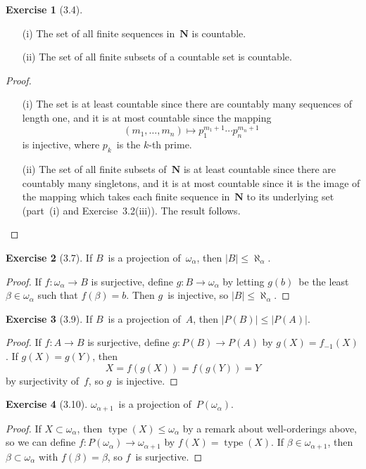 \documentclass[letterpaper,12pt]{article}
\newcommand{\N}{\boldsymbol{N}}
\renewcommand{\P}{P}
\DeclareMathOperator{\type}{type}
\newcommand{\preimage}[1]{#1_{-1}}
\newcommand{\card}[1]{|#1|}
\theoremstyle{definition}
\newtheorem*{exer}{Exercise}
\theoremstyle{remark}
\begin{document}
\begin{exer}[3.4]\
\begin{enumerate}[itemsep=0pt]
\item[(i)] The set of all finite sequences in~\(\N\) is countable.
\item[(ii)] The set of all finite subsets of a countable set is countable.
\end{enumerate}
\end{exer}
\begin{proof}\
\begin{enumerate}[itemsep=0pt]
\item[(i)] The set is at least countable since there are countably many sequences of length one, and it is at most countable since the mapping
\[(m_1,\ldots,m_n)\mapsto p_1^{m_1+1}\cdots p_n^{m_n+1}\]
is injective, where \(p_k\)~is the \(k\)-th prime.
\item[(ii)] The set of all finite subsets of~\(\N\) is at least countable since there are countably many singletons, and it is at most countable since it is the image of the mapping which takes each finite sequence in~\(\N\) to its underlying set (part~(i) and Exercise~3.2(iii)). The result follows.\qedhere
\end{enumerate}
\end{proof}

\begin{exer}[3.7]
If \(B\)~is a projection of~\(\omega_{\alpha}\), then \(\card{B}\le\aleph_{\alpha}\).
\end{exer}
\begin{proof}
If \(f:\omega_{\alpha}\to B\) is surjective, define \(g:B\to\omega_{\alpha}\) by letting \(g(b)\)~be the least \(\beta\in\omega_{\alpha}\) such that \(f(\beta)=b\). Then \(g\)~is injective, so \(\card{B}\le\aleph_{\alpha}\).
\end{proof}

\begin{exer}[3.9]
If \(B\)~is a projection of~\(A\), then \(\card{\P(B)}\le\card{\P(A)}\).
\end{exer}
\begin{proof}
If \(f:A\to B\) is surjective, define \(g:\P(B)\to\P(A)\) by \(g(X)=\preimage{f}(X)\). If \(g(X)=g(Y)\), then
\[X=f(g(X))=f(g(Y))=Y\]
by surjectivity of~\(f\), so \(g\)~is injective.
\end{proof}

\begin{exer}[3.10]
\(\omega_{\alpha+1}\)~is a projection of~\(\P(\omega_{\alpha})\).
\end{exer}
\begin{proof}
If \(X\subset\omega_{\alpha}\), then \(\type(X)\le\omega_{\alpha}\) by a remark about well-orderings above, so we can define \(f:\P(\omega_{\alpha})\to\omega_{\alpha+1}\) by \(f(X)=\type(X)\). If \(\beta\in\omega_{\alpha+1}\), then \(\beta\subset\omega_{\alpha}\) with \(f(\beta)=\beta\), so \(f\)~is surjective.
\end{proof}
\end{document}
